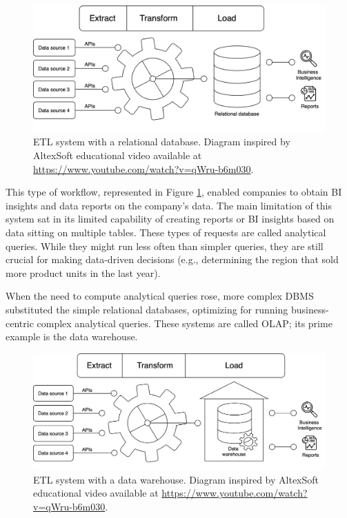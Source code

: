 \begin{figure}[!ht]
    \begin{center}
      \includegraphics[width=\textwidth]{figures/2-background/DeltaLake_evolution-ETL+DB.png}
    \end{center}
    \caption[ETL system with a relational database]{\gls{ETL} system with a relational database. Diagram inspired by AltexSoft educational video available at \url{https://www.youtube.com/watch?v=qWru-b6m030}.}
    \label{fig:ETL+DB}
\end{figure}

This type of workflow, represented in Figure \ref{fig:ETL+DB}, enabled companies to obtain \gls{BI} insights and data reports on the company's data. The main limitation of this system sat in its limited capability of creating reports or \gls{BI} insights based on data sitting on multiple tables. These types of requests are called analytical queries. While they might run less often than simpler queries, they are still crucial for making data-driven decisions (e.g., determining the region that sold more product units in the last year).

When the need to compute analytical queries rose, more complex \gls{DBMS} substituted the simple relational databases, optimizing for running business-centric complex analytical queries. These systems are called \gls{OLAP}; its prime example is the data warehouse.

\begin{figure}[!ht]
    \begin{center}
      \includegraphics[width=\textwidth]{figures/2-background/DeltaLake_evolution-ETL+DW.png}
    \end{center}
    \caption[ETL system with a data warehouse]{\gls{ETL} system with a data warehouse. Diagram inspired by AltexSoft educational video available at \url{https://www.youtube.com/watch?v=qWru-b6m030}.}
    \label{fig:ETL+DW}
\end{figure}

